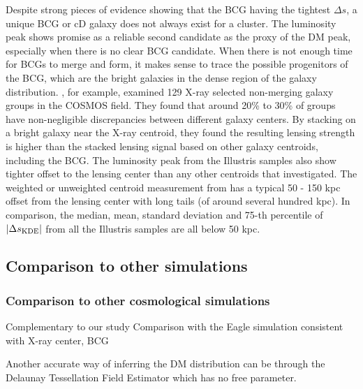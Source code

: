  Despite strong pieces of evidence showing that the BCG having the tightest
 $\Delta s$, a unique BCG or cD galaxy does not always exist for a cluster.   
 The luminosity peak shows promise as a reliable second candidate as the proxy
 of the DM peak, especially when there is no clear BCG candidate. 
 When there is not enough time
for BCGs to merge and form, it makes sense to trace the possible progenitors of
the BCG, which are the bright galaxies in the dense region of the galaxy distribution. 
\cite{George2012a}, for example, examined 129 X-ray selected non-merging galaxy 
groups in the COSMOS field.
They found that around 20\% to 30\% of groups have non-negligible discrepancies
between different galaxy centers. 
By stacking on a bright galaxy near the X-ray centroid, they found  
the resulting lensing strength is higher than the stacked lensing signal based
on other galaxy centroids, including the BCG. 
The luminosity peak from the Illustris samples also show tighter offset to the 
lensing center than any other centroids that \cite{George2012a} investigated. 
The weighted or unweighted centroid measurement from \cite{George2012a} has a 
typical 50 - 150 kpc offset from the
lensing center with long tails (of around several hundred kpc). 
In comparison, the median, mean, standard deviation and 75-th percentile of 
$|\Delta s_{\rm KDE}|$ from all the Illustris samples are all below 50 kpc. 

\subsection{Comparison to other simulations}
\subsubsection{Comparison to other cosmological simulations}
\cite{Johnston2007b}

 

Complementary to our study 
\cite{Hilbert2010}
Comparison with the Eagle simulation   
consistent with \cite{Cui2015} X-ray center, BCG

Another accurate way of inferring the DM distribution can be through 
the Delaunay Tessellation Field Estimator which has no free parameter.



